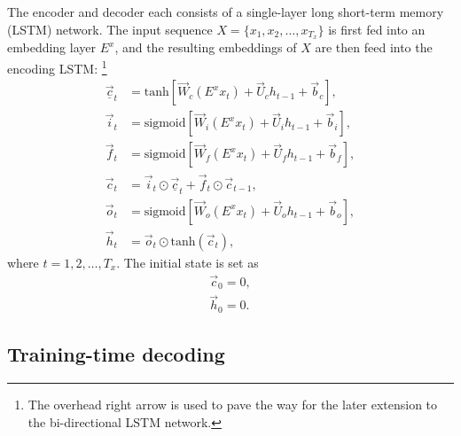 \documentclass[11pt,a4paper]{article}
\begin{document}
The encoder and decoder each consists of a single-layer long short-term memory (LSTM) network. The input sequence $X = \{x_1, x_2, \dots, x_{T_x}\}$ is first fed into an embedding layer $E^x$, and the resulting embeddings of $X$ are then feed into the encoding LSTM:%
\footnote{The overhead right arrow is used to pave the way for the later extension to the bi-directional LSTM network.}
\begin{align}
	\overrightarrow{\underline{c}}_t &= \textrm{tanh}\left[ \overrightarrow{W}_c (E^x x_t) + \overrightarrow{U}_c h_{t-1} + \overrightarrow{b}_c \right], \\
	\overrightarrow{i}_t &= \textrm{sigmoid}\left[ \overrightarrow{W}_i (E^x x_t) + \overrightarrow{U}_i h_{t-1} + \overrightarrow{b}_i \right], \\
	\overrightarrow{f}_t &= \textrm{sigmoid}\left[ \overrightarrow{W}_f (E^x x_t) + \overrightarrow{U}_f h_{t-1} + \overrightarrow{b}_f \right], \\
	\overrightarrow{c}_t &= \overrightarrow{i}_t \odot \overrightarrow{\underline{c}}_t + \overrightarrow{f}_t \odot \overrightarrow{c}_{t-1}, \\
	\overrightarrow{o}_t &= \textrm{sigmoid}\left[ \overrightarrow{W}_o (E^x x_t) + \overrightarrow{U}_o h_{t-1} + \overrightarrow{b}_o \right], \\
	\overrightarrow{h}_t &= \overrightarrow{o}_t \odot \textrm{tanh}(\overrightarrow{c}_t),
\end{align}
where $t = 1, 2, \dots, T_x$. The initial state is set as
\begin{align}
	\overrightarrow{c}_0 = 0, \\
	\overrightarrow{h}_0 = 0.
\end{align}



\subsection{Training-time decoding}
\end{document}
